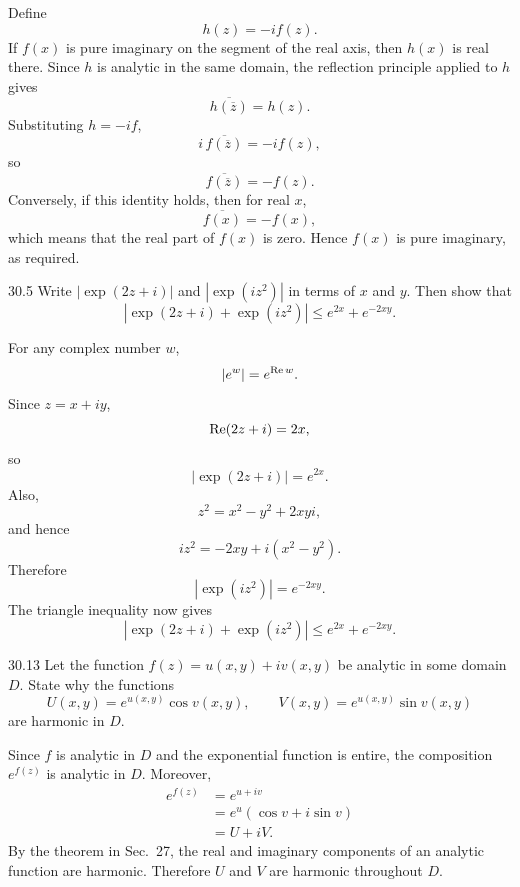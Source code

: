 \documentclass[11pt,oneside]{article}
\begin{document}
\begin{solution}
Define
\[
    h(z)=-if(z).
\]
If \(f(x)\) is pure imaginary on the segment of the real axis, then \(h(x)\) is real there. Since \(h\) is analytic in the same domain, the reflection principle applied to \(h\) gives
\[
    \overline{h(\overline z)}=h(z).
\]
Substituting \(h=-if\),
\[
    i\,\overline{f(\overline z)}=-if(z),
\]
so
\[
    \boxed{\overline{f(\overline z)}=-f(z)}.
\]
Conversely, if this identity holds, then for real \(x\),
\[
    \overline{f(x)}=-f(x),
\]
which means that the real part of \(f(x)\) is zero. Hence \(f(x)\) is pure imaginary, as required.
\end{solution}

\begin{exercise}{30.5}
Write \(|\exp(2z+i)|\) and \(|\exp(iz^2)|\) in terms of \(x\) and \(y\). Then show that
\[
    |\exp(2z+i)+\exp(iz^2)|\le e^{2x}+e^{-2xy}.
\]
\end{exercise}

\begin{solution}
For any complex number \(w\),
\[
    |e^w|=e^{\operatorname{Re} w}.
\]
Since \(z=x+iy\),
\[
    \operatorname{Re}(2z+i)=2x,
\]
so
\[
    |\exp(2z+i)|=e^{2x}.
\]
Also,
\[
    z^2=x^2-y^2+2xyi,
\]
and hence
\[
    iz^2=-2xy+i(x^2-y^2).
\]
Therefore
\[
    |\exp(iz^2)|=e^{-2xy}.
\]
The triangle inequality now gives
\[
    \boxed{|\exp(2z+i)+\exp(iz^2)|\le e^{2x}+e^{-2xy}}.
\]
\end{solution}

\begin{exercise}{30.13}
Let the function \(f(z)=u(x, y)+iv(x, y)\) be analytic in some domain \(D\). State why the functions
\[
    U(x, y)=e^{u(x, y)}\cos v(x, y),
    \qquad
    V(x, y)=e^{u(x, y)}\sin v(x, y)
\]
are harmonic in \(D\).
\end{exercise}

\begin{solution}
Since \(f\) is analytic in \(D\) and the exponential function is entire, the composition \(e^{f(z)}\) is analytic in \(D\). Moreover,
\[
\begin{aligned}
    e^{f(z)}
    &=e^{u+iv}\\
    &=e^u(\cos v+i\sin v)\\
    &=U+iV.
\end{aligned}
\]
By the theorem in Sec.~27, the real and imaginary components of an analytic function are harmonic. Therefore \(U\) and \(V\) are harmonic throughout \(D\).
\end{solution}
\end{document}
